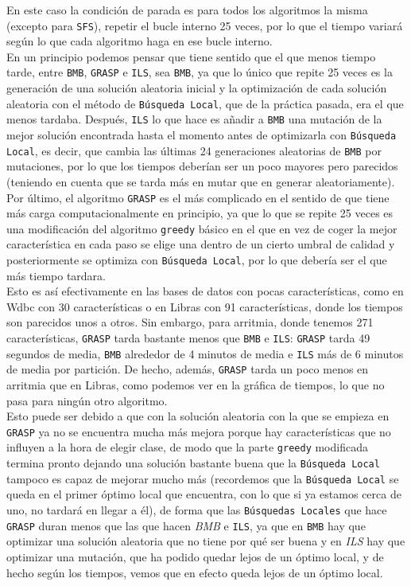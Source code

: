 \documentclass[12pt]{article}
\begin{document}
En este caso la condición de parada es para todos los algoritmos la misma (excepto para \texttt{SFS}), repetir el bucle interno 25 veces, por lo que el tiempo variará según lo que cada algoritmo haga en ese bucle interno.\\
En un principio podemos pensar que tiene sentido que el que menos tiempo tarde, entre \texttt{BMB}, \texttt{GRASP} e \texttt{ILS}, sea \texttt{BMB}, ya que lo único que repite 25 veces es la generación de una solución aleatoria inicial y la optimización de cada solución aleatoria con el método de \texttt{Búsqueda Local}, que de la práctica pasada, era el que menos tardaba. Después, \texttt{ILS} lo que hace es añadir a \texttt{BMB} una mutación de la mejor solución encontrada hasta el momento antes de optimizarla con \texttt{Búsqueda Local}, es decir, que cambia las últimas 24 generaciones aleatorias de \texttt{BMB} por mutaciones, por lo que los tiempos deberían ser un poco mayores pero parecidos (teniendo en cuenta que se tarda más en mutar que en generar aleatoriamente). Por último, el algoritmo \texttt{GRASP} es el más complicado en el sentido de que tiene más carga computacionalmente en principio, ya que lo que se repite 25 veces es una modificación del algoritmo \texttt{greedy} básico en el que en vez de coger la mejor característica en cada paso se elige una dentro de un cierto umbral de calidad y posteriormente se optimiza con \texttt{Búsqueda Local}, por lo que debería ser el que más tiempo tardara.\\
Esto es así efectivamente en las bases de datos con pocas características, como en Wdbc con 30 características o en Libras con 91 características, donde los tiempos son parecidos unos a otros. Sin embargo, para arritmia, donde tenemos 271 características, \texttt{GRASP} tarda bastante menos que \texttt{BMB} e \texttt{ILS}: \texttt{GRASP} tarda 49 segundos de media, \texttt{BMB} alrededor de 4 minutos de media e \texttt{ILS} más de 6 minutos de media por partición. De hecho, además, \texttt{GRASP} tarda un poco menos en arritmia que en Libras, como podemos ver en la gráfica de tiempos, lo que no pasa para ningún otro algoritmo.\\
Esto puede ser debido a que con la solución aleatoria con la que se empieza en \texttt{GRASP} ya no se encuentra mucha más mejora porque hay características que no influyen a la hora de elegir clase, de modo que la parte \texttt{greedy} modificada termina pronto dejando una solución bastante buena que la \texttt{Búsqueda Local} tampoco es capaz de mejorar mucho más (recordemos que la \texttt{Búsqueda Local} se queda en el primer óptimo local que encuentra, con lo que si ya estamos cerca de uno, no tardará en llegar a él), de forma que las \texttt{Búsquedas Locales} que hace \texttt{GRASP} duran menos que las que hacen \textit{BMB} e \texttt{ILS}, ya que en \texttt{BMB} hay que optimizar una solución aleatoria que no tiene por qué ser buena y en \textit{ILS} hay que optimizar una mutación, que ha podido quedar lejos de un óptimo local, y de hecho según los tiempos, vemos que en efecto queda lejos de un óptimo local.\\
\end{document}
